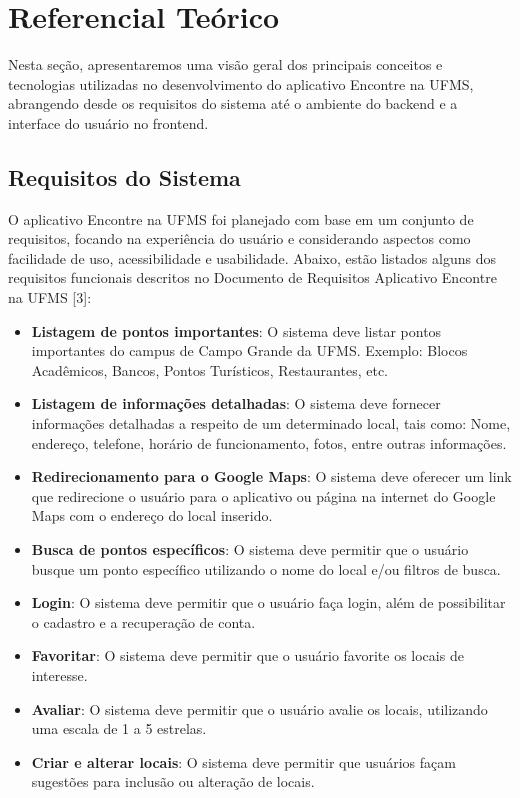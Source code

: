 \section{Referencial Teórico}

Nesta seção, apresentaremos uma visão geral dos principais conceitos e tecnologias utilizadas no desenvolvimento do aplicativo Encontre na UFMS, abrangendo desde os requisitos do sistema até o ambiente do backend e a interface do usuário no frontend.

\subsection{Requisitos do Sistema}

O aplicativo Encontre na UFMS foi planejado com base em um conjunto de requisitos, focando na experiência do usuário e considerando aspectos como facilidade de uso, acessibilidade e usabilidade. Abaixo, estão listados alguns dos requisitos funcionais descritos no Documento de Requisitos Aplicativo Encontre na UFMS [3]:

\begin{itemize}
  \item \textbf{Listagem de pontos importantes}: O sistema deve listar pontos importantes do campus de Campo Grande da UFMS. Exemplo: Blocos Acadêmicos, Bancos, Pontos Turísticos, Restaurantes, etc.
  \item \textbf{Listagem de informações detalhadas}: O sistema deve fornecer informações detalhadas a respeito de um determinado local, tais como: Nome, endereço, telefone, horário de funcionamento, fotos, entre outras informações.
  \item \textbf{Redirecionamento para o Google Maps}:  O sistema deve oferecer um link que redirecione o usuário para o aplicativo ou página na internet do Google Maps com o endereço do local inserido.
  \item \textbf{Busca de pontos específicos}: O sistema deve permitir que o usuário busque um ponto específico utilizando o nome do local e/ou filtros de busca.
  \item \textbf{Login}: O sistema deve permitir que o usuário faça login, além de possibilitar o cadastro e a recuperação de conta.
  \item \textbf{Favoritar}:  O sistema deve permitir que o usuário favorite os locais de interesse.
  \item \textbf{Avaliar}:  O sistema deve permitir que o usuário avalie os locais, utilizando uma escala de 1 a 5 estrelas.
  \item \textbf{Criar e alterar locais}: O sistema deve permitir que usuários façam sugestões para inclusão ou alteração de locais.
\end{itemize}

